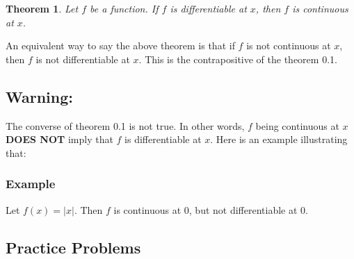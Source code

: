 \documentclass[reqno,psamsfonts]{amsart}
\newtheorem{thm}{Theorem}[section]
\theoremstyle{definition}
\theoremstyle{remark}
\numberwithin{equation}{section}
\begin{document}
\begin{thm}
Let $f$ be a function. If $f$ is differentiable at $x$, then $f$ is continuous at $x$.
\end{thm}
An equivalent way to say the above theorem is that if $f$ is not continuous at $x$, then $f$ is not differentiable at $x$. This is the contrapositive of the theorem 0.1.

\subsection*{Warning:} The converse of theorem 0.1 is not true. In other words, $f$ being continuous at $x$ \textbf{DOES NOT} imply that $f$ is differentiable at $x$. Here is an example illustrating that:

\subsubsection*{Example} Let $f(x) = |x|$. Then $f$ is continuous at $0$, but not differentiable at $0$.

\newpage
\subsection*{Practice Problems}
\end{document}

